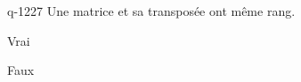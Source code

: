 \begin{truefalse}{q-1227}
Une matrice et sa transposée ont même rang.
\item* Vrai
\item Faux
\end{truefalse}

